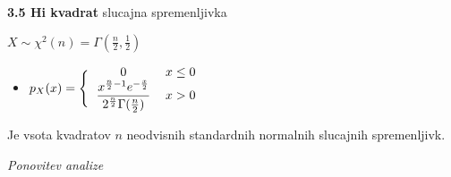\documentclass{article}
\begin{document}
\begin{multicols}{3}
\textbf{3.5 Hi kvadrat} slucajna spremenljivka
\begin{center}
    \begin{math}
        X \sim  \chi^{2}(n) = \Gamma(\frac{n}{2}, \frac{1}{2})
    \end{math}
\end{center}

\begin{itemize}
    \item  \begin{math}
        p_{X}(x) =
        \Bigg\{\begin{tabular}{ccc}
          $0$  & $x \leq 0$ & \\
          $\dfrac{x^{\frac{n}{2} - 1} e ^{- \frac{x}{2}}}{2^{\frac{n}{2}} \Gamma(\frac{n}{2})}$ & $x > 0$ & \\
        \end{tabular}
    \end{math} 
\end{itemize}

Je vsota kvadratov $n$ neodvisnih standardnih normalnih slucajnih spremenljivk.
\bigskip

\textit{Ponovitev analize}\\


\end{multicols}
\end{document}
